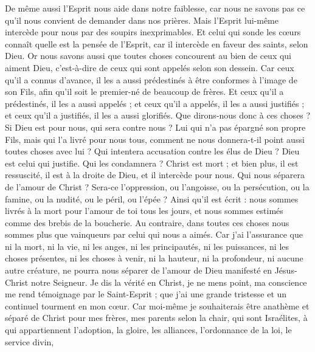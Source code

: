 \begin{multicols}{2}
De même aussi l'Esprit nous aide dans notre faiblesse, car nous ne savons pas ce qu'il nous convient de demander dans nos prières. Mais l'Esprit lui-même intercède pour nous par des soupirs inexprimables.
Et celui qui sonde les cœurs connaît quelle est la pensée de l'Esprit, car il intercède en faveur des saints, selon Dieu.
Or nous savons aussi que toutes choses concourent au bien de ceux qui aiment Dieu, c'est-à-dire de ceux qui sont appelés selon son dessein.
Car ceux qu'il a connus d'avance, il les a aussi prédestinés à être conformes à l'image de son Fils, afin qu'il soit le premier-né de beaucoup de frères.
Et ceux qu'il a prédestinés, il les a aussi appelés ; et ceux qu'il a appelés, il les a aussi justifiés ; et ceux qu'il a justifiés, il les a aussi glorifiés.
Que dirons-nous donc à ces choses ? Si Dieu est pour nous, qui sera contre nous ?
Lui qui n'a pas épargné son propre Fils, mais qui l'a livré pour nous tous, comment ne nous donnera-t-il point aussi toutes choses avec lui ?
Qui intentera accusation contre les élus de Dieu ? Dieu est celui qui justifie.
Qui les condamnera ? Christ est mort ; et bien plus, il est ressuscité, il est à la droite de Dieu, et il intercède pour nous.
Qui nous séparera de l'amour de Christ ? Sera-ce l'oppression, ou l'angoisse, ou la persécution, ou la famine, ou la nudité, ou le péril, ou l'épée ?
Ainsi qu'il est écrit : nous sommes livrés à la mort pour l'amour de toi tous les jours, et nous sommes estimés comme des brebis de la boucherie.
Au contraire, dans toutes ces choses nous sommes plus que vainqueurs par celui qui nous a aimés.
Car j'ai l'assurance que ni la mort, ni la vie, ni les anges, ni les principautés, ni les puissances, ni les choses présentes, ni les choses à venir,
ni la hauteur, ni la profondeur, ni aucune autre créature, ne pourra nous séparer de l'amour de Dieu manifesté en Jésus-Christ notre Seigneur.
\VerseOne{}Je dis la vérité en Christ, je ne mens point, ma conscience me rend témoignage par le Saint-Esprit ;
que j'ai une grande tristesse et un continuel tourment en mon cœur.
Car moi-même je souhaiterais être anathème et séparé de Christ pour mes frères, mes parents selon la chair,
qui sont Israélites, à qui appartiennent l'adoption, la gloire, les alliances, l'ordonnance de la loi, le service divin,

\end{multicols}
